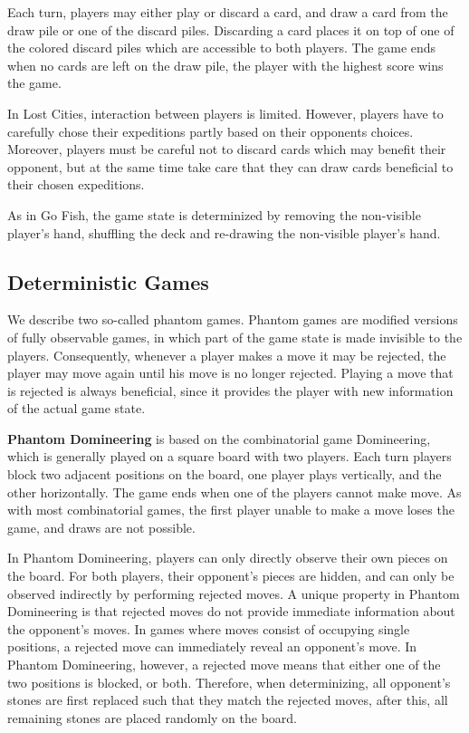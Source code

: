 \documentclass[a4paper]{llncs}
\begin{document}
Each turn, players may either play or discard a card, and draw a card from the draw pile or one of the discard piles. Discarding a card places it on top of one of the colored discard piles which are accessible to both players. The game ends when no cards are left on the draw pile, the player with the highest score wins the game.

In Lost Cities, interaction between players is limited. However, players have to carefully chose their expeditions partly based on their opponents choices. Moreover, players must be careful not to discard cards which may benefit their opponent, but at the same time take care that they can draw cards beneficial to their chosen expeditions. 

As in Go Fish, the game state is determinized by removing the non-visible player's hand, shuffling the deck and re-drawing the non-visible player's hand.

\subsection{Deterministic Games}

We describe two so-called phantom games. Phantom games are modified versions of fully observable games, in which part of the game state is made invisible to the players. Consequently, whenever a player makes a move it may be rejected, the player may move again until his move is no longer rejected. Playing a move that is rejected is always beneficial, since it provides the player with new information of the actual game state.

{\sc \bf Phantom Domineering} is based on the combinatorial game Domineering, which is generally played on a square board with two players. Each turn players block two adjacent positions on the board, one player plays vertically, and the other horizontally. The game ends when one of the players cannot make move. As with most combinatorial games, the first player unable to make a move loses the game, and draws are not possible.

In Phantom Domineering, players can only directly observe their own pieces on the board. For both players, their opponent's pieces are hidden, and can only be observed indirectly by performing rejected moves. A unique property in Phantom Domineering is that rejected moves do not provide immediate information about the opponent's moves. In games where moves consist of occupying single positions, a rejected move can immediately reveal an opponent's move. In Phantom Domineering, however, a rejected move means that either one of the two positions is blocked, or both. Therefore, when determinizing, all opponent's stones are first replaced such that they match the rejected moves, after this, all remaining stones are placed randomly on the board.
\end{document}
